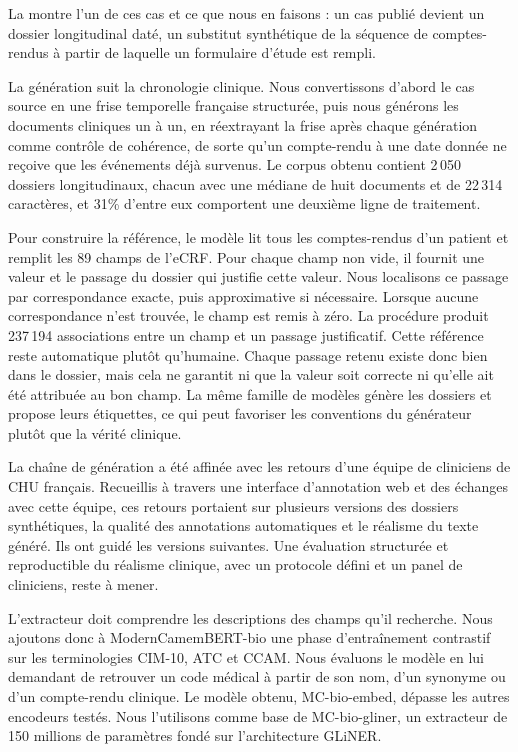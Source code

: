 La  montre l'un de ces cas et ce que nous en faisons : un
cas publié devient un dossier longitudinal daté, un substitut synthétique de la
séquence de comptes-rendus à partir de laquelle un formulaire d'étude est rempli.

La génération suit la chronologie clinique. Nous convertissons d'abord le cas source
en une frise temporelle française structurée, puis nous générons les documents cliniques un
à un, en réextrayant la frise après chaque génération comme contrôle de cohérence,
de sorte qu'un compte-rendu à une date donnée ne reçoive que les événements déjà
survenus. Le corpus obtenu contient 2\,050 dossiers longitudinaux, chacun avec une
médiane de huit documents et de 22\,314 caractères, et 31\% d'entre eux comportent
une deuxième ligne de traitement.

Pour construire la référence, le modèle lit tous les comptes-rendus d'un patient et
remplit les 89 champs de l'eCRF. Pour chaque champ non vide, il fournit une valeur et
le passage du dossier qui justifie cette valeur. Nous localisons ce passage par
correspondance exacte, puis approximative si nécessaire. Lorsque aucune
correspondance n'est trouvée, le champ est remis à zéro. La procédure produit
237\,194 associations entre un champ et un passage justificatif. Cette référence
reste automatique plutôt qu'humaine. Chaque passage retenu existe donc bien dans le
dossier, mais cela ne garantit ni que la valeur soit correcte ni qu'elle ait été
attribuée au bon champ. La même famille de modèles génère les dossiers et propose
leurs étiquettes, ce qui peut favoriser les conventions du générateur plutôt que la
vérité clinique.

La chaîne de génération a été affinée avec les retours d'une équipe de cliniciens de
CHU français. Recueillis à travers une interface d'annotation web et des échanges avec
cette équipe, ces retours portaient sur plusieurs versions des dossiers synthétiques,
la qualité des annotations automatiques et le réalisme du texte généré. Ils ont guidé
les versions suivantes. Une évaluation structurée et reproductible du réalisme
clinique, avec un protocole défini et un panel de cliniciens, reste à mener.

L'extracteur doit comprendre les descriptions des champs qu'il recherche. Nous
ajoutons donc à ModernCamemBERT-bio une phase d'entraînement contrastif sur les
terminologies CIM-10, ATC et CCAM. Nous évaluons le modèle en lui demandant de
retrouver un code médical à partir de son nom, d'un synonyme ou d'un compte-rendu
clinique. Le modèle obtenu, MC-bio-embed, dépasse les autres encodeurs testés. Nous
l'utilisons comme base de MC-bio-gliner, un extracteur de 150 millions de paramètres
fondé sur l'architecture GLiNER.

